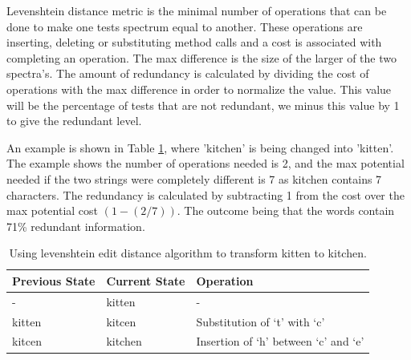 Levenshtein distance metric is the minimal number of operations that can be done to make one tests spectrum equal to another. These operations are inserting, deleting or substituting method calls and a cost is associated with completing an operation. The max difference is the size of the larger of the two spectra's. The amount of redundancy is calculated by dividing the cost of operations with the max difference in order to normalize the value. This value will be the percentage of tests that are not redundant, we minus this value by 1 to give the redundant level.

An example is shown in Table \ref{levenTable}, where 'kitchen' is being changed into 'kitten'. The example shows the number of operations needed is 2, and the max potential needed if the two strings were completely different is 7 as kitchen contains 7 characters. The redundancy is calculated by subtracting 1 from the cost over the max potential cost $(1 - (2/7)) $. The outcome being that the words contain 71\% redundant information. 

\begin{table}[]
\centering
\caption{Using levenshtein edit distance algorithm to transform kitten to kitchen.}
\label{levenTable}
\begin{tabular}{|l|l|l|}
\hline
{\bf Previous State} & {\bf Current State} & {\bf Operation}                      \\ \hline
-                    & kitten              & -                                    \\ \hline
kitten               & kitcen              & Substitution of `t' with `c'         \\ \hline
kitcen               & kitchen             & Insertion of `h' between `c' and `e' \\ \hline
\end{tabular}
\end{table}



 
